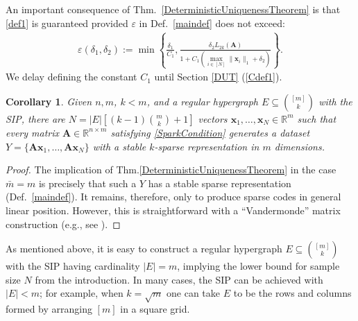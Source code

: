 \documentclass[9pt,twocolumn]{pnas-new}
\newtheorem{proposition}{Proposition}
\newtheorem{corollary}{Corollary}
\begin{document}
An important consequence of Thm.~\ref{DeterministicUniquenessTheorem} is that \eqref{def1} is guaranteed provided $\varepsilon$ in Def.~\ref{maindef} does not exceed: %
\begin{align}\label{epsdel}
\varepsilon(\delta_1, \delta_2) := \min \left\{ \frac{\delta_1}{ C_1 }, \frac{ \delta_2 L_{2k}(\mathbf{A})}{ 1 + C_1 \left( \max_{i \in [N]} \|\mathbf{x}_i\|_1  + \delta_2 \right) } \right\}.
\end{align}
We delay defining the constant $C_1$ until Section \ref{DUT} (\eqref{Cdef1}).  %



\begin{corollary}\label{DeterministicUniquenessCorollary}
Given $n, m$, $k < m$, and a regular hypergraph $E \subseteq {[m] \choose k}$ with the SIP, there are $N =  |E| \left[ (k-1){m \choose k} + 1  \right]$ vectors \mbox{$\mathbf{x}_1, \ldots, \mathbf{x}_N \in \mathbb{R}^m$} such that every matrix $\mathbf{A} \in \mathbb{R}^{n \times m}$ satisfying \eqref{SparkCondition} generates a dataset $Y = \{\mathbf{A}\mathbf{x}_1, \ldots, \mathbf{A}\mathbf{x}_N\}$ with a stable $k$-sparse representation in $m$ dimensions.
\end{corollary}
\begin{proof}
The implication of Thm.\ref{DeterministicUniquenessTheorem} in the case $\bar{m} = m$ is precisely that such a $Y$ has a stable sparse representation (Def.~\ref{maindef}).  It remains, therefore, only to produce sparse codes in general linear position.  However, this is straightforward with a ``Vandermonde'' matrix construction (e.g., see \cite{Hillar15}).
\end{proof}

As mentioned above, it is easy to construct a regular hypergraph $E \subseteq {[m] \choose k}$ with the SIP having cardinality $|E| = m$, implying the lower bound for sample size $N$ from the introduction. In many cases, the SIP can be achieved with $|E| < m$; for example, when $k = \sqrt{m}$ one can take $E$ to be the rows and columns formed by arranging $[m]$ in a square grid.  
\end{document}
